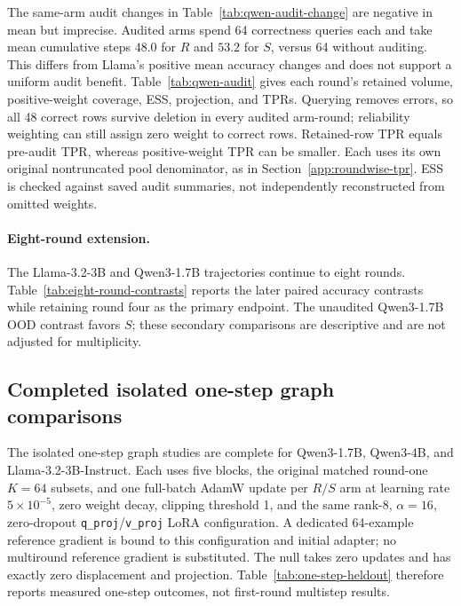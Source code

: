 


The same-arm audit changes in Table~\ref{tab:qwen-audit-change} are
negative in mean but imprecise. Audited arms spend 64 correctness queries
each and take mean cumulative steps $48.0$ for $R$ and $53.2$ for $S$,
versus 64 without auditing. This differs from Llama's positive mean
accuracy changes and does not support a uniform audit benefit.
Table~\ref{tab:qwen-audit} gives each round's retained volume,
positive-weight coverage, ESS, projection, and TPRs. Querying removes
errors, so all 48 correct rows survive deletion in every audited
arm-round; reliability weighting can still assign zero weight to correct
rows. Retained-row TPR equals pre-audit TPR, whereas positive-weight TPR
can be smaller. Each uses its own original nontruncated pool denominator,
as in Section~\ref{app:roundwise-tpr}. ESS is checked against saved
audit summaries, not independently reconstructed from omitted weights.






\paragraph{Eight-round extension.}
The Llama-3.2-3B and Qwen3-1.7B trajectories continue to eight rounds.
Table~\ref{tab:eight-round-contrasts} reports the later paired accuracy
contrasts while retaining round four as the primary endpoint.
The unaudited Qwen3-1.7B OOD contrast favors $S$; these secondary
comparisons are descriptive and are not adjusted for multiplicity.




\subsection{Completed isolated one-step graph comparisons}
\label{app:one-step-results}

The isolated one-step graph studies are complete for Qwen3-1.7B,
Qwen3-4B, and Llama-3.2-3B-Instruct. Each uses five blocks, the original
matched round-one $K=64$ subsets, and one full-batch AdamW update per
$R/S$ arm at learning rate $5\times10^{-5}$, zero weight decay,
clipping threshold 1, and the same rank-8, $\alpha=16$, zero-dropout
\texttt{q\_proj}/\texttt{v\_proj} LoRA configuration. A dedicated
64-example reference gradient is bound to this configuration and initial
adapter; no multiround reference gradient is substituted. The null takes
zero updates and has exactly zero displacement and projection.
Table~\ref{tab:one-step-heldout} therefore reports measured one-step
outcomes, not first-round multistep results.

